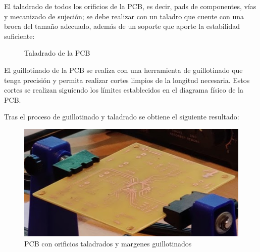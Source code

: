 \begin{itemize}
   El taladrado de todos los orificios de la PCB, es decir, pads de componentes, vías y mecanizado de sujeción; se debe realizar con un taladro que cuente con una broca del tamaño adecuado, además de un soporte que aporte la estabilidad suficiente:
   
    \begin{figure}[H]
    \centering
    \caption{Taladrado de la PCB}
    \label{fig:lego}
    \end{figure}
   
   El guillotinado de la PCB se realiza con una herramienta de guillotinado que tenga precisión y permita realizar cortes limpios de la longitud necesaria. Estos cortes se realizan siguiendo los límites establecidos en el diagrama físico de la PCB.
   
   Tras el proceso de guillotinado y taladrado se obtiene el siguiente resultado:
   
    \begin{figure}[H]
    \centering 
    \includegraphics[width=0.5\linewidth]{pictures/PCBTaladrada.PNG}
    \caption{PCB con orificios taladrados y margenes guillotinados}
    \label{fig:kdiagram}
    \end{figure}
    

\end{itemize}
